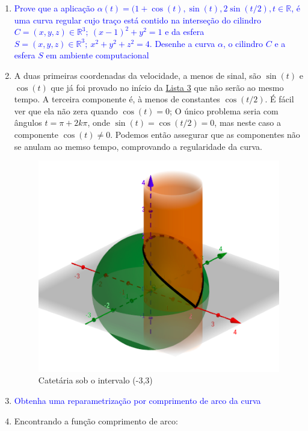 \documentclass[12pt,letterpaper]{article}
\newcommand{\real}{\mathbb{R}}
\newcommand{\ex}[1]{\textcolor{blue}{\textbf{Exercício #1}}}
\newcommand{\sol}[1]{\textbf{Solução #1}}
\newcommand{\blue}[1]{{\color{blue}{#1}}}
\begin{document}
\begin{enumerate}
	\item[\ex{2}] \textcolor{blue}{Prove que a aplicação $\alpha(t) = (1 +\cos(t),\sin(t),2\sin(t/2),t\in\real$, é uma curva regular cujo traço está contido na interseção do cilindro $C= (x,y,z)\in\real^3; ~(x-1)^2+y^2= 1$ e da esfera $S= (x,y,z)\in\real^3;~x^2+y^2+z^2= 4$. Desenhe a curva $\alpha$, o cilindro $C$ e a esfera $S$ em ambiente computacional}
	
	\item[\sol{2}] A duas primeiras coordenadas da velocidade, a menos de sinal, são $\sin (t)$ e $\cos(t)$ que já foi provado no início da \href{https://github.com/reneroliveira/Curves_and_Surfaces/blob/main/lists/list3.pdf}{Lista 3} que não serão ao mesmo tempo. A terceira componente é, à menos de constantes $\cos(t/2)$. É fácil ver que ela não zera quando $\cos(t)=0$; O único problema seria com ângulos $t=\pi+2k\pi$, onde $\sin(t)=\cos(t/2)=0$, mas neste caso a componente $\cos(t)\neq0$. Podemos então assegurar que as componentes não se anulam ao memso tempo, comprovando a regularidade da curva.
	
	\begin{figure}[!htb]
		\centering
		\includegraphics[scale=0.7]{../images/L4_ex2.png}
		\caption{Catetária sob o intervalo (-3,3)}
		\label{ex3}
	\end{figure}
	\item[\ex{3}] \textcolor{blue}{Obtenha uma reparametrização por comprimento de arco da curva }
	\blue{
	$$\alpha(t)=(e^t\cos(t),e^t\sin(t),e^t),~t\in\real$$}
	\item[\sol{3}] Encontrando a função comprimento de arco:
	

\end{enumerate}
\end{document}
